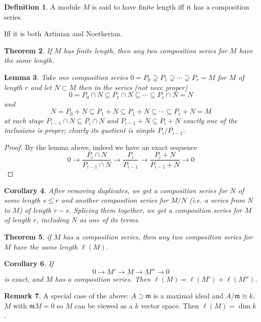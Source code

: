 \documentclass[11pt,a4paper]{article}
\theoremstyle{definition}
\newtheorem{definition}{Definition}[section]
\newtheorem{remark}[definition]{Remark}
\theoremstyle{plain}
\newtheorem{theorem}[definition]{Theorem}
\newtheorem{lemma}[definition]{Lemma}
\newtheorem{corollary}[definition]{Corollary}
\theoremstyle{remark}
\begin{document}
\begin{definition}
    A module $M$ is said to have finite length iff it has a composition series. 
    
    Iff it is both Artinian and  Noetherian.
\end{definition}

\begin{theorem}
    If $M$ has finite length, then any two composition series for $M$ have the same length.
\end{theorem}

\begin{lemma}
    Take one composition series $0 = P_0 \supsetneq P_1 \supsetneq \cdots \supsetneq P_r = M$ for $M$ of length $r$ and let 
    $N \subset M$ then in the series (not necc proper) 
    $$0 = P_0 \cap N \subseteq P_1 \cap N \subseteq \cdots \subseteq P_r \cap N = N$$
    and 
    $$N = P_0 + N \subseteq P_1 + N \subseteq P_1 + N \subseteq \cdots \subseteq P_r + N = M$$
    at each stage $P_{i-1} \cap N \subseteq P_i \cap N$ and $P_{i-1} + N \subseteq P_i + N$ exactly one of the inclusions is proper; clearly its quotient 
    is simple $P_i / P_{i-1}$.
\end{lemma}

\begin{proof}
    By the lemma above, indeed we have an exact sequence 
    $$0 \to \frac{P_i \cap N}{P_{i-1} \cap N} \to \frac{P_i}{P_{i-1}} \to \frac{P_i + N}{P_{i-1}+N} \to 0$$
\end{proof}

\begin{corollary}
    After removing duplicates, we get a composition series for $N$ of some length $s \le r$ and another composition series for $M/N$ (i.e. a series from $N$ to $M$)
    of length $r-s$. Splicing them together, we get a composition series for $M$ of length $r$, including $N$ as one of its terms. 
\end{corollary}

\begin{theorem}
    if $M$ has a composition series, then any two composition series for $M$ have the same length $\ell(M)$.
\end{theorem}

\begin{corollary}
    If 
    $$0 \to M' \to M \to M'' \to 0$$
    is exact, and $M$ has a composition series. Then $\ell(M) = \ell(M') + \ell(M'')$. 
\end{corollary}

\begin{remark}
    A special case of the above: $A \supset \mathfrak{m}$ is a maximal ideal and $A/\mathfrak{m} \cong k$, 
    $M$ with $\mathfrak{m} M = 0$ so $M$ can be viewed as a $k$ vector space. Then $\ell(M) = \dim k$. 
\end{remark}
\end{document}

